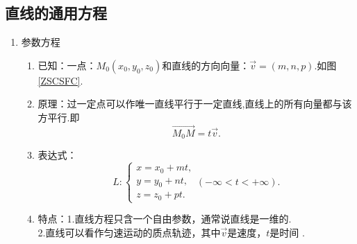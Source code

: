 \subsection{直线的通用方程}
\begin{enumerate}[\large1.]
	\item {\color{dy}\large 参数方程}\label{直线的参数方程}
	\begin{enumerate}[]
		\item 已知：{\color{dl}一点}：$M_0(x_0,y_0,z_0)$和{\color{dl}直线的方向向量}：$\overrightarrow{v}=(m,n,p)$.如图\ref{ZSCSFC}.
		\item 原理：过一定点可以作唯一直线平行于一定直线,直线上的所有向量都与该方平行.即
		$$\overrightarrow{M_0M}=t\overrightarrow{v}.$$
		\item 表达式：
		\begin{equation}
		L: \begin{cases}
		x=x_0+mt,\\
		y=y_0+nt,\\
		z=z_0+pt.
		\end{cases}(-\infty<t<+\infty).
		\end{equation}
		\item 特点：1.直线方程只含一个自由参数，通常说直线是一维的. \\
		2.直线可以看作匀速运动的质点轨迹，其中$\overrightarrow{v}$是速度，$t$是时间 .
	\end{enumerate}
	\begin{figure}[h]
\end{figure}
\end{enumerate}
